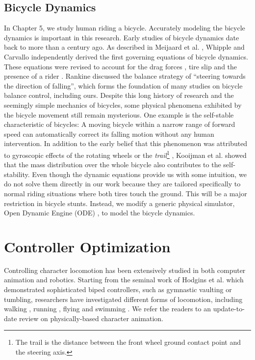 \subsection{Bicycle Dynamics} In Chapter 5, we study human riding a bicycle. Accurately modeling the bicycle dynamics is important in this research. Early studies of bicycle dynamics date back to more than a century ago. As described in Meijaard et al. \cite{Meijaard2007}, Whipple \cite{Whipple1899} and Carvallo \cite{Carvallo1900} independently derived the first governing equations of bicycle dynamics. These equations were revised to account for the drag forces \cite{Collins1963}, tire slip \cite{Singh1964} and the presence of a rider \cite{van1975method}. Rankine \cite{Rankine1870} discussed the balance strategy of ``steering towards the direction of falling'', which forms the foundation of many studies on bicycle balance control, including ours. Despite this long history of research and the seemingly simple mechanics of bicycles, some physical phenomena exhibited by the bicycle movement still remain mysterious. One example is the self-stable characteristic of bicycles: A moving bicycle within a narrow range of forward speed can automatically correct its falling motion without any human intervention. In addition to the early belief that this phenomenon was attributed to gyroscopic effects of the rotating wheels \cite{Klein1910} or the \emph{trail}\footnote{The trail is the distance between the front wheel ground contact point and the steering axis.} \cite{Jones1970}, Kooijman et al. \cite{Kooijman2011} showed that the mass distribution over the whole bicycle also contributes to the self-stability. Even though the dynamic equations provide us with some intuition, we do not solve them directly in our work because they are tailored specifically to normal riding situations where both tires touch the ground. This will be a major restriction in bicycle stunts. Instead, we modify a generic physical simulator, Open Dynamic Engine (ODE) \cite{ode:2008}, to model the bicycle dynamics.

\section{Controller Optimization}

Controlling character locomotion has been extensively studied in both computer animation and robotics. Starting from the seminal work of Hodgins et al. \cite{Hodgins:1995:AHA} which demonstrated sophisticated biped
controllers, such as gymnastic vaulting or tumbling, researchers have investigated different forms of locomotion, including walking \cite{Yin:2007,Wang:2012}, running \cite{Hodgins:1995:AHA,Kwon:2010}, flying \cite{Wu:2003} and swimming \cite{Grzeszczuk:1995}.  We refer the readers to an update-to-date review \cite{Geijtenbeek2012a} on physically-based character animation.

